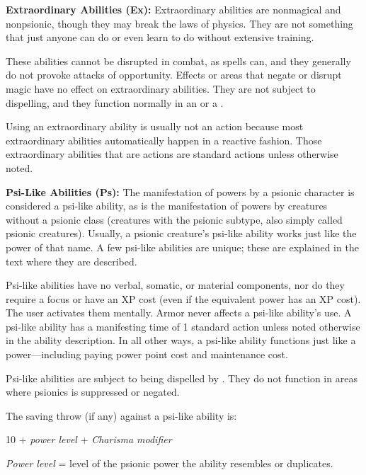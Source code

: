 \textbf{Extraordinary Abilities (Ex):} Extraordinary abilities are nonmagical and nonpsionic, though they may break the laws of physics. They are not something that just anyone can do or even learn to do without extensive training.

These abilities cannot be disrupted in combat, as spells can, and they generally do not provoke attacks of opportunity. Effects or areas that negate or disrupt magic have no effect on extraordinary abilities. They are not subject to dispelling, and they function normally in an  or a .

Using an extraordinary ability is usually not an action because most extraordinary abilities automatically happen in a reactive fashion. Those extraordinary abilities that are actions are standard actions unless otherwise noted.

\textbf{Psi-Like Abilities (Ps):} The manifestation of powers by a psionic character is considered a psi-like ability, as is the manifestation of powers by creatures without a psionic class (creatures with the psionic subtype, also simply called psionic creatures). Usually, a psionic creature's psi-like ability works just like the power of that name. A few psi-like abilities are unique; these are explained in the text where they are described.

Psi-like abilities have no verbal, somatic, or material components, nor do they require a focus or have an XP cost (even if the equivalent power has an XP cost). The user activates them mentally. Armor never affects a psi-like ability's use. A psi-like ability has a manifesting time of 1 standard action unless noted otherwise in the ability description. In all other ways, a psi-like ability functions just like a power---including paying power point cost and maintenance cost. %

Psi-like abilities are subject to being dispelled by . They do not function in areas where psionics is suppressed or negated.

The saving throw (if any) against a psi-like ability is:

\begin{Formula*}{10 + \textit{power level} + \textit{Charisma modifier}}
	\item \textit{Power level} = level of the psionic power the ability resembles or duplicates.
\end{Formula*}

